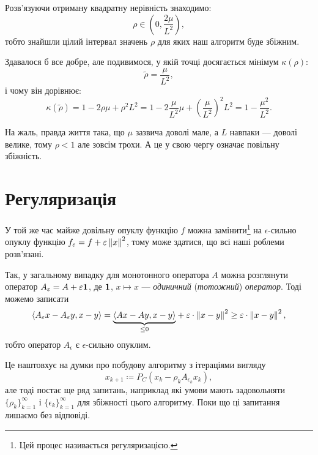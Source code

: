 Розв'язуючи отриману квадратну нерівність знаходимо:
\begin{equation}
    \rho \in \left(0, \frac{2 \mu}{L^2}\right),
\end{equation}
тобто знайшли цілий інтервал значень $\rho$ для яких наш алгоритм буде збіжним. \medskip

Здавалося б все добре, але подивимося, у якій точці досягається мінімум $\kappa(\rho)$:
\begin{equation}
    \tilde \rho = \frac{\mu}{L^2},
\end{equation}
і чому він дорівнює:
\begin{equation}
    \kappa(\tilde \rho) = 1 - 2 \rho \mu + \rho^2 L^2 = 1 - 2 \frac{\mu}{L^2} \mu + \left( \frac{\mu}{L^2} \right)^2 L^2 = 1 - \frac{\mu^2}{L^2}.
\end{equation}

\begin{remark}
    На жаль, правда життя така, що $\mu$ зазвича доволі мале, а $L$ навпаки --- доволі велике, тому $\rho < 1$ але зовсім трохи. А це у свою чергу означає повільну збіжність.
\end{remark}

\section{Регуляризація}

У той же час майже довільну опуклу функцію $f$ можна замінити\footnote{Цей процес називається регуляризацією.} на $\epsilon$-сильно опуклу функцію $f_\epsilon = f + \epsilon\no{x}^2$, тому може здатися, що всі наші роблеми розв'язані. \medskip

Так, у загальному випадку для монотонного оператора $A$ можна розглянути оператор $A_\epsilon = A + \epsilon {\bf 1}$, де ${\bf 1}$, $x \mapsto x$ --- \emph{одиничний} (\emph{тотожний}) \emph{оператор}. Тоді можемо записати
\begin{equation}
    \sp{A_\epsilon x - A_\epsilon y, x - y} = \underset{\le 0}{\underbrace{\sp{A x - A y, x - y}}} + \epsilon \cdot \no{x - y}^2 \ge \epsilon \cdot \no{x - y}^2,
\end{equation}
тобто оператор $A_\epsilon$ є $\epsilon$-сильно опуклим. \medskip

Це наштовхує на думки про побудову алгоритму з ітераціями вигляду
\begin{equation}
    x_{k + 1} \coloneqq P_C \left( x_k - \rho_k A_{\epsilon_k} x_k \right),
\end{equation}
але тоді постає ще ряд запитань, наприклад які умови мають задовольняти $\{\rho_k\}_{k = 1}^\infty$ і $\{\epsilon_k\}_{k = 1}^\infty$ для збіжності цього алгоритму. Поки що ці запитання лишаємо без відповіді.

